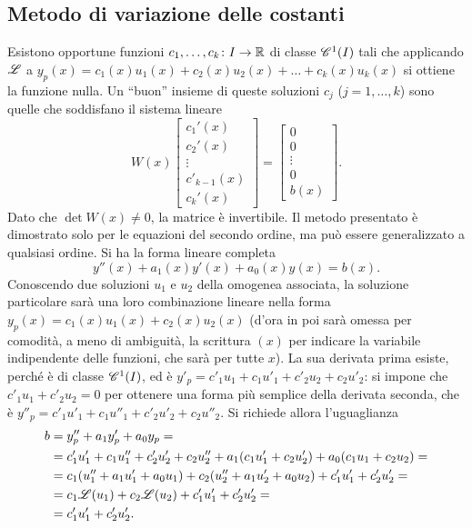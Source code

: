 \subsection*{Metodo di variazione delle costanti}
Esistono opportune funzioni $c_1,\dots,c_k\colon I\to\R$ di classe $\cont[1]{I}$ tali che applicando $\lin$ a $y_p(x)=c_1(x)u_1(x)+c_2(x)u_2(x)+\dots+c_k(x)u_k(x)$ si ottiene la funzione nulla. Un ``buon'' insieme di queste soluzioni $c_j$ ($j=1,\dots,k$) sono quelle che soddisfano il sistema lineare
\begin{equation}
W(x)\begin{bmatrix}c_1'(x)\\c_2'(x)\\\vdots\\c'_{k-1}(x)\\c_k'(x)\end{bmatrix}=
\begin{bmatrix}0\\0\\\vdots\\0\\b(x)\end{bmatrix}.
\end{equation}
Dato che $\det W(x)\neq 0$, la matrice è invertibile.
Il metodo presentato è dimostrato solo per le equazioni del secondo ordine, ma può essere generalizzato a qualsiasi ordine.
Si ha la forma lineare completa
\begin{equation} \label{eq:lin-2}
y''(x)+a_1(x)y'(x)+a_0(x)y(x)=b(x).
\end{equation}
Conoscendo due soluzioni $u_1$ e $u_2$ della omogenea associata, la soluzione particolare sarà una loro combinazione lineare nella forma $y_p(x)=c_1(x)u_1(x)+c_2(x)u_2(x)$ (d'ora in poi sarà omessa per comodità, a meno di ambiguità, la scrittura $(x)$ per indicare la variabile indipendente delle funzioni, che sarà per tutte $x$). La sua derivata prima esiste, perché è di classe $\cont[1]{I}$, ed è $y'_p=c'_1u_1+c_1u'_1+c'_2u_2+c_2u'_2$: si impone che $c'_1u_1+c'_2u_2=0$ per ottenere una forma più semplice della derivata seconda, che è $y''_p=c'_1u'_1+c_1u''_1+c'_2u'_2+c_2u''_2$. Si richiede allora l'uguaglianza
\[\begin{split}
b	&=y''_p+a_1y'_p+a_0y_p=\\
	&=c'_1u'_1+c_1u''_1+c'_2u'_2+c_2u''_2+a_1(c_1u'_1+c_2u'_2)+a_0(c_1u_1+c_2u_2)=\\
	&=c_1(u''_1+a_1u'_1+a_0u_1)+c_2(u''_2+a_1u'_2+a_0u_2)+c'_1u'_1+c'_2u'_2=\\
	&=c_1\lin(u_1)+c_2\lin(u_2)+c'_1u'_1+c'_2u'_2=\\
	&=c'_1u'_1+c'_2u'_2.
\end{split}\]
